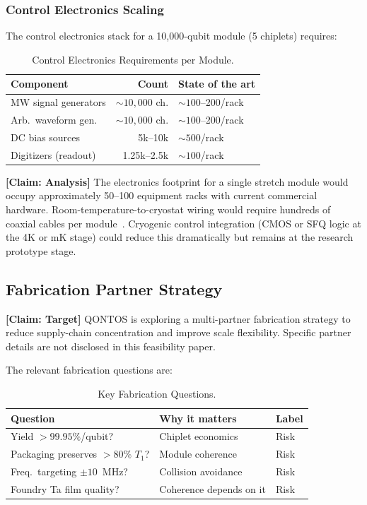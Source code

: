 \documentclass[conference]{IEEEtran}
\begin{document}
\subsubsection{Control Electronics Scaling}

The control electronics stack for a 10,000-qubit module (5 chiplets) requires:

\begin{table}[htbp]
\centering
\caption{Control Electronics Requirements per Module.}
\label{tab:ctrl_electronics}
\begin{tabular}{lrp{2.5cm}}
\toprule
\textbf{Component} & \textbf{Count} & \textbf{State of the art} \\
\midrule
MW signal generators & ${\sim}10{,}000$ ch. & ${\sim}100$--200/rack \\
Arb.\ waveform gen. & ${\sim}10{,}000$ ch. & ${\sim}100$--200/rack \\
DC bias sources & 5k--10k & ${\sim}500$/rack \\
Digitizers (readout) & 1.25k--2.5k & ${\sim}100$/rack \\
\bottomrule
\end{tabular}
\end{table}

\textbf{[Claim: Analysis]} The electronics footprint for a single stretch module would occupy approximately 50--100 equipment racks with current commercial hardware. Room-temperature-to-cryostat wiring would require hundreds of coaxial cables per module~\cite{krinner2019}. Cryogenic control integration (CMOS or SFQ logic at the 4K or mK stage) could reduce this dramatically but remains at the research prototype stage.

\subsection{Fabrication Partner Strategy}

\textbf{[Claim: Target]} QONTOS is exploring a multi-partner fabrication strategy to reduce supply-chain concentration and improve scale flexibility. Specific partner details are not disclosed in this feasibility paper.

The relevant fabrication questions are:

\begin{table}[htbp]
\centering
\caption{Key Fabrication Questions.}
\label{tab:fab_questions}
\begin{tabular}{lp{3cm}l}
\toprule
\textbf{Question} & \textbf{Why it matters} & \textbf{Label} \\
\midrule
Yield $> 99.95\%$/qubit? & Chiplet economics & Risk \\
Packaging preserves $> 80\%$ $T_1$? & Module coherence & Risk \\
Freq.\ targeting $\pm 10$~MHz? & Collision avoidance & Risk \\
Foundry Ta film quality? & Coherence depends on it & Risk \\
\bottomrule
\end{tabular}
\end{table}
\end{document}
